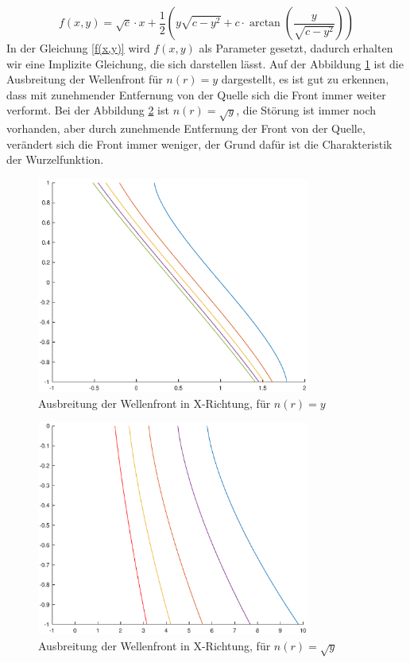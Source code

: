 \begin{refsection}
\begin{equation}\label{f(x,y)}
f(x,y)= \sqrt{c}\cdot x + \dfrac{1}{2}\left(y \sqrt{c-y^{2}}+c \cdot \arctan\left(  \dfrac{y}{\sqrt{c-y^{2}}}\right) \right) 
\end{equation}
In der Gleichung \eqref{f(x,y)} wird $f(x,y)$ als Parameter gesetzt, dadurch erhalten wir eine Implizite Gleichung, die sich darstellen lässt. 
Auf der Abbildung \ref{fig:plotwf1} ist die Ausbreitung der Wellenfront für $n(r)=y$ dargestellt, es ist gut zu erkennen, dass mit zunehmender Entfernung von der Quelle sich die Front immer weiter verformt. Bei der Abbildung \ref{fig:plotwf2} ist $n(r)= \sqrt{y}$, die Störung ist immer noch vorhanden, aber durch zunehmende Entfernung der Front von der Quelle, verändert sich die Front immer weniger, der Grund dafür ist die Charakteristik der Wurzelfunktion.
\begin{figure}
  \centering
  \includegraphics[width=0.8\textwidth]{adaptiv/images/plotwf1}
  \caption{Ausbreitung der Wellenfront in X-Richtung, für $n(r)=y$}
  \label{fig:plotwf1}
\end{figure}

\begin{figure}
  \centering
  \includegraphics[width=0.8\textwidth]{adaptiv/images/plotwf2}
  \caption{Ausbreitung der Wellenfront in X-Richtung, für $n(r)=\sqrt{y}$}
  \label{fig:plotwf2}
\end{figure}

\printbibliography[heading=subbibliography]
\end{refsection}















